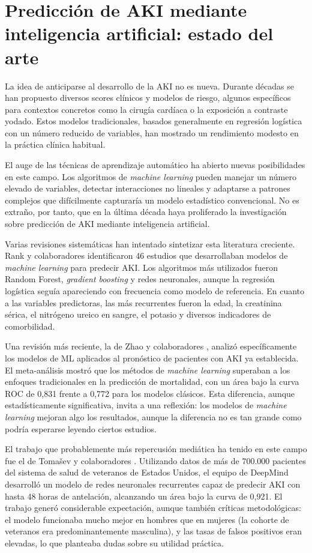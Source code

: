 \documentclass[12pt, a4paper, oneside]{report}
\begin{document}
\section{Predicción de AKI mediante inteligencia artificial: estado del arte}

La idea de anticiparse al desarrollo de la AKI no es nueva. Durante décadas se han propuesto diversos scores clínicos y modelos de riesgo, algunos específicos para contextos concretos como la cirugía cardíaca o la exposición a contraste yodado. Estos modelos tradicionales, basados generalmente en regresión logística con un número reducido de variables, han mostrado un rendimiento modesto en la práctica clínica habitual.

El auge de las técnicas de aprendizaje automático ha abierto nuevas posibilidades en este campo. Los algoritmos de \textit{machine learning} pueden manejar un número elevado de variables, detectar interacciones no lineales y adaptarse a patrones complejos que difícilmente capturaría un modelo estadístico convencional. No es extraño, por tanto, que en la última década haya proliferado la investigación sobre predicción de AKI mediante inteligencia artificial.

Varias revisiones sistemáticas han intentado sintetizar esta literatura creciente. Rank y colaboradores \parencite{rank2022mlaki} identificaron 46 estudios que desarrollaban modelos de \textit{machine learning} para predecir AKI. Los algoritmos más utilizados fueron Random Forest, \textit{gradient boosting} y redes neuronales, aunque la regresión logística seguía apareciendo con frecuencia como modelo de referencia. En cuanto a las variables predictoras, las más recurrentes fueron la edad, la creatinina sérica, el nitrógeno ureico en sangre, el potasio y diversos indicadores de comorbilidad.

Una revisión más reciente, la de Zhao y colaboradores \parencite{zhao2024akiml}, analizó específicamente los modelos de ML aplicados al pronóstico de pacientes con AKI ya establecida. El meta-análisis mostró que los métodos de \textit{machine learning} superaban a los enfoques tradicionales en la predicción de mortalidad, con un área bajo la curva ROC de 0,831 frente a 0,772 para los modelos clásicos. Esta diferencia, aunque estadísticamente significativa, invita a una reflexión: los modelos de \textit{machine learning} mejoran algo los resultados, aunque la diferencia no es tan grande como podría esperarse leyendo ciertos estudios.

El trabajo que probablemente más repercusión mediática ha tenido en este campo fue el de Tomašev y colaboradores \parencite{tomasev2019nature}. Utilizando datos de más de 700.000 pacientes del sistema de salud de veteranos de Estados Unidos, el equipo de DeepMind desarrolló un modelo de redes neuronales recurrentes capaz de predecir AKI con hasta 48 horas de antelación, alcanzando un área bajo la curva de 0,921. El trabajo generó considerable expectación, aunque también críticas metodológicas: el modelo funcionaba mucho mejor en hombres que en mujeres (la cohorte de veteranos era predominantemente masculina), y las tasas de falsos positivos eran elevadas, lo que planteaba dudas sobre su utilidad práctica.
\end{document}
